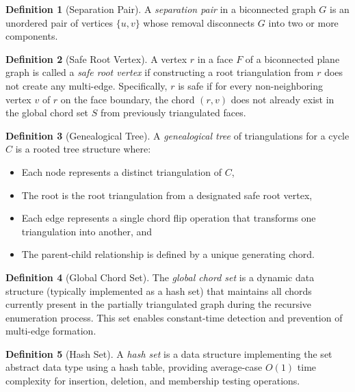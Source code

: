 \documentclass[12pt,a4paper]{article}
\theoremstyle{definition}
\newtheorem{definition}{Definition}
\theoremstyle{remark}
\begin{document}
\begin{definition}[Separation Pair]
A \emph{separation pair} in a biconnected graph $G$ is an unordered pair of vertices $\{u,v\}$ whose removal disconnects $G$ into two or more components.
\end{definition}

\begin{definition}[Safe Root Vertex]
A vertex $r$ in a face $F$ of a biconnected plane graph is called a \emph{safe root vertex} if constructing a root triangulation from $r$ does not create any multi-edge. Specifically, $r$ is safe if for every non-neighboring vertex $v$ of $r$ on the face boundary, the chord $(r, v)$ does not already exist in the global chord set $S$ from previously triangulated faces.
\end{definition}

\begin{definition}[Genealogical Tree]
A \emph{genealogical tree} of triangulations for a cycle $C$ is a rooted tree structure where:
\begin{itemize}
    \item Each node represents a distinct triangulation of $C$,
    \item The root is the root triangulation from a designated safe root vertex,
    \item Each edge represents a single chord flip operation that transforms one triangulation into another, and
    \item The parent-child relationship is defined by a unique generating chord.
\end{itemize}
\end{definition}

\begin{definition}[Global Chord Set]
The \emph{global chord set} is a dynamic data structure (typically implemented as a hash set) that maintains all chords currently present in the partially triangulated graph during the recursive enumeration process. This set enables constant-time detection and prevention of multi-edge formation.
\end{definition}

\begin{definition}[Hash Set]
A \emph{hash set} is a data structure implementing the set abstract data type using a hash table, providing average-case $O(1)$ time complexity for insertion, deletion, and membership testing operations.
\end{definition}
\end{document}
